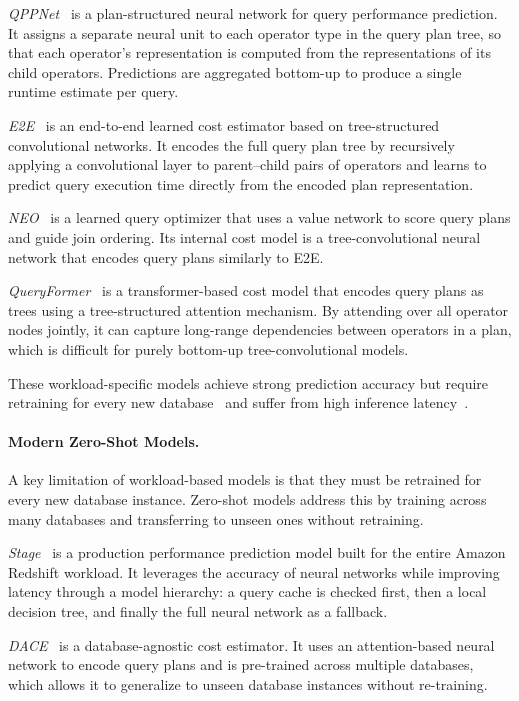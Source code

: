 \textit{QPPNet}~\parencite{qppnet} is a plan-structured neural network for query performance prediction.
It assigns a separate neural unit to each operator type in the query plan tree,
so that each operator's representation is computed from the representations of its child operators.
Predictions are aggregated bottom-up to produce a single runtime estimate per query.

\textit{E2E}~\parencite{e2e} is an end-to-end learned cost estimator based on tree-structured convolutional networks.
It encodes the full query plan tree by recursively applying a convolutional layer to parent--child pairs of operators
and learns to predict query execution time directly from the encoded plan representation.

\textit{NEO}~\parencite{neo} is a learned query optimizer that uses a value network
to score query plans and guide join ordering.
Its internal cost model is a tree-convolutional neural network
that encodes query plans similarly to E2E.

\textit{QueryFormer}~\parencite{queryformer} is a transformer-based cost model
that encodes query plans as trees using a tree-structured attention mechanism.
By attending over all operator nodes jointly,
it can capture long-range dependencies between operators in a plan,
which is difficult for purely bottom-up tree-convolutional models.

These workload-specific models achieve strong prediction accuracy but require retraining for every new database~\parencite{zeroshot} and suffer from high inference latency~\parencite{stage}.

\paragraph{Modern Zero-Shot Models.}
A key limitation of workload-based models is that they must be retrained for every new database instance.
Zero-shot models address this by training across many databases and transferring to unseen ones without retraining.

\textit{Stage}~\parencite{stage} is a production performance prediction model built for the entire Amazon Redshift workload.
It leverages the accuracy of neural networks while improving latency through a model hierarchy: a query cache is checked first, then a local decision tree, and finally the full neural network as a fallback.

\textit{DACE}~\parencite{dace} is a database-agnostic cost estimator.
It uses an attention-based neural network to encode query plans
and is pre-trained across multiple databases,
which allows it to generalize to unseen database instances without re-training.


